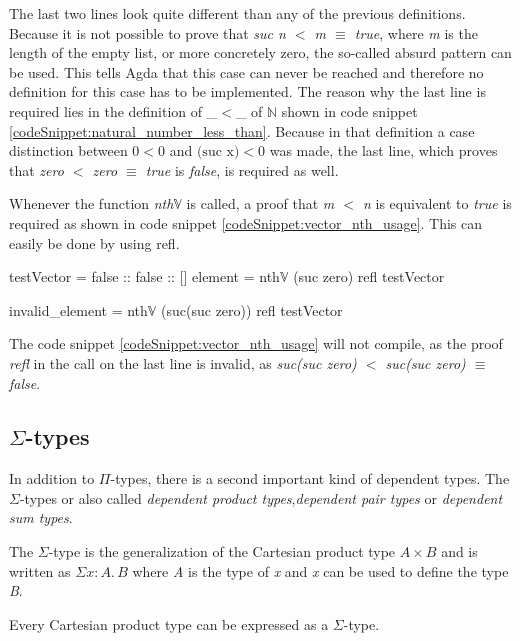 The last two lines look quite different than any of the previous definitions.
Because it is not possible to prove that \emph{suc n $<$ m $\equiv$ true}, where \emph{m} is the length of the empty list, or more concretely zero, the so-called absurd pattern can be used. 
This tells Agda that this case can never be reached and therefore no definition for this case has to be implemented.
The reason why the last line is required lies in the definition of \_$<$\_ of $\mathbb{N}$ shown in code snippet \ref{codeSnippet:natural_number_less_than}.
Because in that definition a case distinction between $0 < 0$ and $\text{(suc x)} < 0$ was made, the last line, which proves that \emph{zero $<$ zero $\equiv$ true} is \emph{false}, is required as well.

Whenever the function \emph{nth$\mathbb{V}$} is called, a proof that \emph{m $<$ n} is equivalent to \emph{true} is required as shown in code snippet \ref{codeSnippet:vector_nth_usage}. This can easily be done by using refl.

\begin{codesnippet}[mathescape=true, caption={Usage of \emph{nth} function in Agda}, label={codeSnippet:vector_nth_usage}]
testVector = false :: false :: []
element = nth$\mathbb{V}$ (suc zero) refl testVector

invalid_element = nth$\mathbb{V}$ (suc(suc zero)) 
                  refl testVector
\end{codesnippet}

The code snippet \ref{codeSnippet:vector_nth_usage} will not compile, as the proof \emph{refl} in the call on the last line is invalid, as \emph{suc(suc zero) $<$ suc(suc zero) $\equiv$ false}.

\subsection{$\Sigma$-types}
In addition to $\Pi$-types, there is a second important kind of dependent types. 
The $\Sigma$-types or also called \emph{dependent product types}\cite{10.1145/2841316},\emph{dependent pair types}\cite{10.1145/2841316} or \emph{dependent sum types}\cite{10.5555/1076265}.

The $\Sigma$-type is the generalization of the Cartesian product type $A \times B$ and is written as $\Sigma x:A. \, B$ where \emph{A} is the type of \emph{x} and \emph{x} can be used to define the type \emph{B}.

Every Cartesian product type can be expressed as a $\Sigma$-type.

